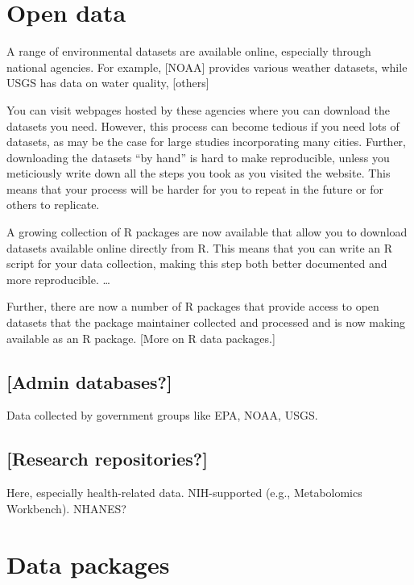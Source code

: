 \documentclass[]{tufte-book}
\begin{document}
\hypertarget{open-data}{%
\section{Open data}\label{open-data}}

A range of environmental datasets are available online, especially through national agencies.
For example, {[}NOAA{]} provides various weather datasets, while USGS has data on water quality,
{[}others{]}

You can visit webpages hosted by these agencies where you can download the datasets you need.
However, this process can become tedious if you need lots of datasets, as may be the case for
large studies incorporating many cities. Further, downloading the datasets ``by hand'' is hard
to make reproducible, unless you meticiously write down all the steps you took as you visited
the website. This means that your process will be harder for you to repeat in the future
or for others to replicate.

A growing collection of R packages are now available that allow you to download datasets
available online directly from R. This means that you can write an R script for your data
collection, making this step both better documented and more reproducible. \ldots{}

Further, there are now a number of R packages that provide access to open datasets that the
package maintainer collected and processed and is now making available as an R package.
{[}More on R data packages.{]}

\hypertarget{admin-databases}{%
\subsection{{[}Admin databases?{]}}\label{admin-databases}}

Data collected by government groups like EPA, NOAA, USGS.

\hypertarget{research-repositories}{%
\subsection{{[}Research repositories?{]}}\label{research-repositories}}

Here, especially health-related data.
NIH-supported (e.g., Metabolomics Workbench).
NHANES?

\hypertarget{data-packages}{%
\section{Data packages}\label{data-packages}}
\end{document}
